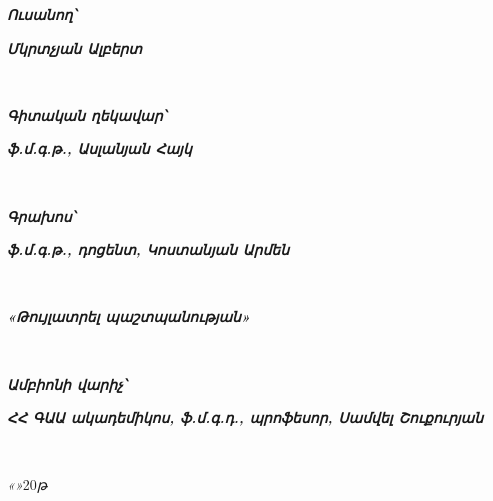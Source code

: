     {
        \linespread{1}
        {
            \large
            \raggedright
            \parbox[t]{2.5cm}{\fontsize{13}{0}\textbf{\textit{Ուսանող՝}}}
            \parbox[t]{0cm}{\underline{\hspace{4cm}} \scriptsize{}} \hfill
            \parbox[t]{9.5cm}{\fontsize{13}{0}\textbf{\textit{Մկրտչյան Ալբերտ}}} \\
        }

        \vspace{2cm}
        {
            \large
            \raggedright
            \parbox[t]{5.2cm}{\fontsize{13}{0}\textbf{\textit{Գիտական ղեկավար՝}}}
            \parbox[t]{0cm}{\underline{\hspace{4cm}} \scriptsize{}} \hfill
            \parbox[t]{6.9cm}{\raggedright\fontsize{13}{0}\textbf{\textit{ֆ.մ.գ.թ., Ասլանյան Հայկ}}} \\
        }

        \vspace{2cm}
        {
            \large
            \raggedright
            \parbox[t]{2.5cm}{\fontsize{13}{0}\textbf{\textit{Գրախոս՝}}}
            \parbox[t]{0cm}{\underline{\hspace{4cm}} \scriptsize{}} \hfill
            \parbox[t]{9.5cm}{\fontsize{13}{0}\textbf{\textit{ֆ.մ.գ.թ., դոցենտ, Կոստանյան Արմեն}}} \\
        }


        \vfill
        {
            \large
            \raggedright
            \fontsize{13}{0}
            \textbf{\textit{«Թույլատրել պաշտպանության»}}
        } \\

        \vspace{2cm}
        {
            \large
            \raggedright
            \parbox[t]{3.9cm}{\fontsize{13}{0}\textbf{\textit{Ամբիոնի վարիչ՝}}}
            \parbox[t]{2cm}{\underline{\hspace{4cm}} \scriptsize{}} \hfill
            \parbox[t]{8cm}{\raggedright\fontsize{13}{0}\textbf{\textit{ՀՀ ԳԱԱ ակադեմիկոս, ֆ.մ.գ.դ., պրոֆեսոր, Սամվել Շուքուրյան}}} \\
        }

        \vspace{1.5cm}
        {
            \raggedright
            \large
            \textit{«}\underline{\hspace{1.5cm}}\textit{»}\underline{\hspace{2.5cm}}20\underline{\hspace{0.5cm}}\textit{թ} \\
        }

        \newpage
    }